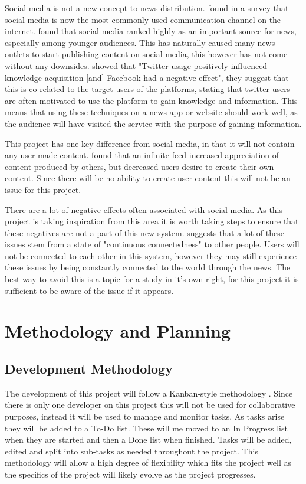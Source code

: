 \documentclass[12pt,titlepage]{article}
\begin{document}
  Social media is not a new concept to news distribution. \cite{standley} found
  in a survey that social media is now the most commonly used communication
  channel on the internet. \cite{boukes} found that social media ranked highly
  as an important source for news, especially among younger audiences. This has
  naturally caused many news outlets to start publishing content on social
  media, this however has not come without any downsides. \cite{boukes} showed
  that "Twitter usage positively influenced knowledge acquisition [and] Facebook
  had a negative effect", they suggest that this is co-related to the target
  users of the platforms, stating that twitter users are often motivated to use
  the platform to gain knowledge and information. This means that using these
  techniques on a news app or website should work well, as the audience will have
  visited the service with the purpose of gaining information.

  This project has one key difference from social media, in that it will not
  contain any user made content. \cite{zhang} found that an infinite feed
  increased appreciation of content produced by others, but decreased users
  desire to create their own content. Since there will be no ability to create
  user content this will not be an issue for this project.

  There are a lot of negative effects often associated with social media. As
  this project is taking inspiration from this area it is worth taking steps to
  ensure that these negatives are not a part of this new system.
  \cite{lupinacci} suggests that a lot of these issues stem from a state of
  "continuous connectedness" to other people. Users will not be connected to
  each other in this system, however they may still experience these issues by
  being constantly connected to the world through the news. The best way to
  avoid this is a topic for a study in it's own right, for this project it is
  sufficient to be aware of the issue if it appears.

\section{Methodology and Planning}

  \subsection{Development Methodology}

  The development of this project will follow a Kanban-style methodology
  \citep{kanban}. Since there is only one developer on this project this will not
  be used for collaborative purposes, instead it will be used to manage and
  monitor tasks. As tasks arise they will be added to a To-Do list. These will
  me moved to an In Progress list when they are started and then a Done list
  when finished. Tasks will be added, edited and split into sub-tasks as needed
  throughout the project. This methodology will allow a high degree of
  flexibility which fits the project well as the specifics of the project will
  likely evolve as the project progresses.
\end{document}
